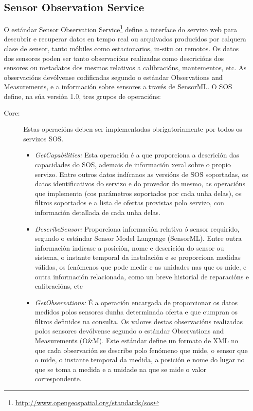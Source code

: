 \subsection{Sensor Observation Service}
O estándar Sensor Observation Service\footnote{\url{http://www.opengeospatial.org/standards/sos}} define a interface do servizo web para descubrir e recuperar datos en tempo real ou arquivados producidos por calquera clase de sensor, tanto móbiles como estacionarios, in-situ ou remotos. Os datos dos sensores poden ser tanto observacións realizadas como descricións dos sensores ou metadatos dos mesmos relativos a calibracións, mantementos, etc. As observacións devólvense codificadas segundo o estándar Observations and Measurements, e a información sobre sensores a través de SensorML. O SOS define, na súa versión 1.0, tres grupos de operacións:
\begin{description}
\item[Core:] Estas operacións deben ser implementadas obrigatoriamente por todos os servizos SOS.
\begin{itemize}
\item \textit{GetCapabilities:} Esta operación é a que proporciona a descrición das capacidades do SOS, ademais de información xeral sobre o propio servizo. Entre outros datos indícanos as versións de SOS soportadas, os datos identificativos do servizo e do provedor do mesmo, as operacións que implementa (cos parámetros soportados por cada unha delas), os filtros soportados e a lista de ofertas provistas polo servizo, con información detallada de cada unha delas.
\item \textit{DescribeSensor:} Proporciona información relativa ó sensor requirido, segundo o estándar Sensor Model Language (SensorML). Entre outra información indícase a posición, nome e descrición do sensor ou sistema, o instante temporal da instalación e se proporciona medidas válidas, os fenómenos que pode medir e as unidades nas que os mide, e outra información relacionada, como un breve historial de reparacións e
calibracións, etc
\item \textit{GetObservations:} É a operación encargada de proporcionar os datos medidos polos sensores dunha determinada oferta e que cumpran os filtros definidos na consulta. Os valores destas observacións realizadas polos sensores devólvense segundo o estándar Observations and Measurements (O\&M). Este estándar define un formato de XML no que cada observación se describe polo fenómeno que mide, o sensor que o mide, o instante temporal da medida, a posición e nome do lugar no que se toma a medida e a unidade na que se mide o valor correspondente.

\end{itemize}
\end{description}
